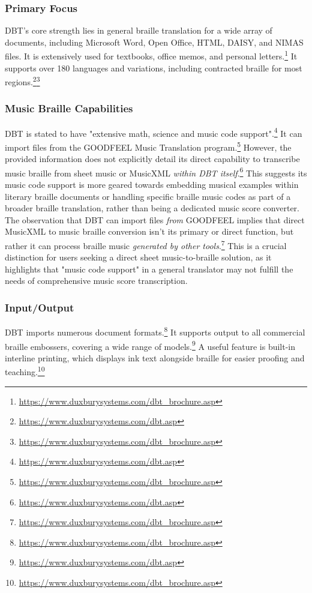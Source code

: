 \subsubsection{Primary Focus}
DBT's core strength lies in general braille translation for a wide array of documents, including Microsoft Word, Open Office, HTML, DAISY, and NIMAS files. It is extensively used for textbooks, office memos, and personal letters.\footnote{\url{https://www.duxburysystems.com/dbt_brochure.asp}} It supports over 180 languages and variations, including contracted braille for most regions.\footnote{\url{https://www.duxburysystems.com/dbt.asp}}\footnote{\url{https://www.duxburysystems.com/dbt_brochure.asp}}

\subsubsection{Music Braille Capabilities}
DBT is stated to have "extensive math, science and music code support".\footnote{\url{https://www.duxburysystems.com/dbt.asp}} It can import files from the GOODFEEL Music Translation program.\footnote{\url{https://www.duxburysystems.com/dbt_brochure.asp}} However, the provided information does not explicitly detail its direct capability to transcribe music braille from sheet music or MusicXML \textit{within DBT itself}.\footnote{\url{https://www.duxburysystems.com/dbt.asp}} This suggests its music code support is more geared towards embedding musical examples within literary braille documents or handling specific braille music codes as part of a broader braille translation, rather than being a dedicated music score converter. The observation that DBT can import files \textit{from} GOODFEEL implies that direct MusicXML to music braille conversion isn't its primary or direct function, but rather it can process braille music \textit{generated by other tools}.\footnote{\url{https://www.duxburysystems.com/dbt_brochure.asp}} This is a crucial distinction for users seeking a direct sheet music-to-braille solution, as it highlights that "music code support" in a general translator may not fulfill the needs of comprehensive music score transcription.

\subsubsection{Input/Output}
DBT imports numerous document formats.\footnote{\url{https://www.duxburysystems.com/dbt_brochure.asp}} It supports output to all commercial braille embossers, covering a wide range of models.\footnote{\url{https://www.duxburysystems.com/dbt.asp}} A useful feature is built-in interline printing, which displays ink text alongside braille for easier proofing and teaching.\footnote{\url{https://www.duxburysystems.com/dbt_brochure.asp}}

